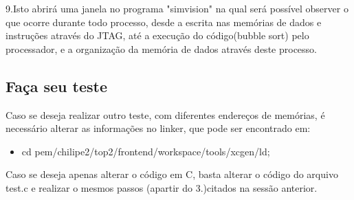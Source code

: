 \par 9.Isto abrirá uma janela no programa "simvision" na qual será possível observer o que ocorre durante todo processo, desde a escrita nas memórias de dados e instruções através do JTAG, até a execução do código(bubble sort) pelo processador, e a organização da memória de dados através deste processo.
\\
\subsection{Faça seu teste}
Caso se deseja realizar outro teste, com diferentes endereços de memórias, é necessário alterar as informações no linker, que pode ser encontrado em:

\begin{itemize}
  \item cd pem/chilipe2/top2/frontend/workspace/tools/xcgen/ld;
\end{itemize}

Caso se deseja apenas alterar o código em C, basta alterar o código do arquivo test.c e realizar o mesmos passos (apartir do 3.)citados na sessão anterior.
\\
